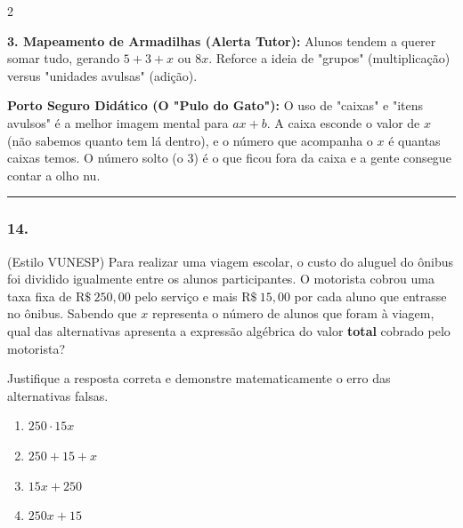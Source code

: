 \begin{multicols*}{2}
\begin{tcolorbox}[colback=CorTitUm!5, colframe=CorTitUm, boxrule=1pt, arc=4pt, left=6pt, right=6pt, top=6pt, bottom=6pt]
    \textbf{3. Mapeamento de Armadilhas (Alerta Tutor):} Alunos tendem a querer somar tudo, gerando $5+3+x$ ou $8x$. Reforce a ideia de "grupos" (multiplicação) versus "unidades avulsas" (adição).
    \end{tcolorbox}
    \vspace{0.15cm}
    
    \begin{boxexplicacao}
    \textbf{Porto Seguro Didático (O "Pulo do Gato"):} O uso de "caixas" e "itens avulsos" é a melhor imagem mental para $ax + b$. A caixa esconde o valor de $x$ (não sabemos quanto tem lá dentro), e o número que acompanha o $x$ é quantas caixas temos. O número solto (o 3) é o que ficou fora da caixa e a gente consegue contar a olho nu.
    \end{boxexplicacao}
\fi

\par\vspace{\espacoQuestao}

\noindent\textcolor{CorLinha}{\rule{\linewidth}{0.5pt}} 
\par\vspace{\espacoPreQuestao}
\subsubsection*{14.} 
\begin{enunciadoLiteral}
(Estilo VUNESP) Para realizar uma viagem escolar, o custo do aluguel do ônibus foi dividido igualmente entre os alunos participantes. O motorista cobrou uma taxa fixa de $ \text{R\$} \ 250,00 $ pelo serviço e mais $ \text{R\$} \ 15,00 $ por cada aluno que entrasse no ônibus. Sabendo que $x$ representa o número de alunos que foram à viagem, qual das alternativas apresenta a expressão algébrica do valor \textbf{total} cobrado pelo motorista?

Justifique a resposta correta e demonstre matematicamente o erro das alternativas falsas.

\begin{enumerate}[label=\alph*), itemsep=\espacoAlt]
    \item $ 250 \cdot 15x $
    \item $ 250 + 15 + x $
    \item $ 15x + 250 $
    \item $ 250x + 15 $
\end{enumerate}
\end{enunciadoLiteral}


\end{multicols*}
